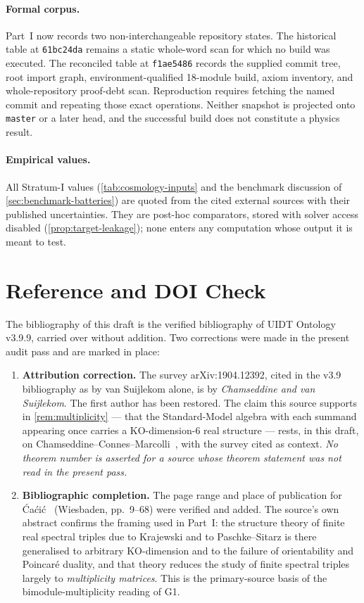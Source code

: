 \documentclass[12pt,a4paper,twoside]{article}
\theoremstyle{plain}
\theoremstyle{definition}
\theoremstyle{remark}
\begin{document}
\paragraph{Formal corpus.}
Part~I now records two non-interchangeable repository states. The historical
table at \texttt{61bc24da} remains a static whole-word scan for which no build
was executed. The reconciled table at \texttt{f1ae5486} records the supplied
commit tree, root import graph, environment-qualified 18-module build, axiom
inventory, and whole-repository proof-debt scan. Reproduction requires
fetching the named commit and repeating those exact operations. Neither
snapshot is projected onto \texttt{master} or a later head, and the successful
build does not constitute a physics result.

\paragraph{Empirical values.}
All Stratum-I values (\cref{tab:cosmology-inputs} and the benchmark
discussion of \cref{sec:benchmark-batteries}) are quoted from the cited
external sources with their published uncertainties. They are post-hoc
comparators, stored with solver access disabled
(\cref{prop:target-leakage}); none enters any computation whose output
it is meant to test.

\section{Reference and DOI Check}
\label{sec:doi-check}

\noindent The bibliography of this draft is the verified bibliography of
UIDT Ontology v3.9.9, carried over without addition. Two corrections
were made in the present audit pass and are marked in place:

\begin{enumerate}[leftmargin=1.6em,itemsep=0.25em]
\item \textbf{Attribution correction.} The survey arXiv:1904.12392,
cited in the v3.9 bibliography as by van Suijlekom alone, is by
\emph{Chamseddine and van Suijlekom}. The first author has been
restored. The claim this source supports in
\cref{rem:multiplicity} --- that the Standard-Model algebra with each
summand appearing once carries a KO-dimension-6 real structure ---
rests, in this draft, on Chamseddine--Connes--Marcolli~\cite{ccm2007},
with the survey cited as context. \emph{No theorem number is asserted
for a source whose theorem statement was not read in the present pass.}
\item \textbf{Bibliographic completion.} The page range and place of
publication for \'Ca\'ci\'c~\cite{cacic2011} (Wiesbaden, pp.~9--68) were
verified and added. The source's own abstract confirms the framing used
in Part~I: the structure theory of finite real spectral triples due to
Krajewski and to Paschke--Sitarz is there generalised to arbitrary
KO-dimension and to the failure of orientability and Poincar\'e duality,
and that theory reduces the study of finite spectral triples largely to
\emph{multiplicity matrices}. This is the primary-source basis of the
bimodule-multiplicity reading of G1.
\end{enumerate}
\end{document}
